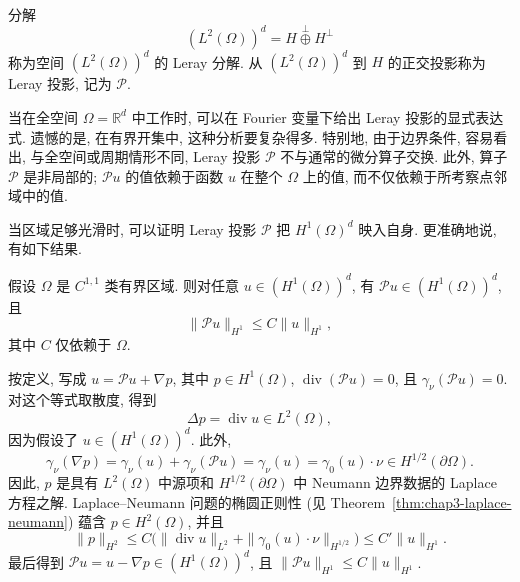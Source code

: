\begin{Definition}
\label{def:chap4-leray-decomposition}
分解
\[
 (L^2(\Omega))^d=H\mathbin{\mathop\oplus\limits^\perp}H^\perp
\]
称为空间 $(L^2(\Omega))^d$ 的 Leray 分解. 从 $(L^2(\Omega))^d$ 到 $H$ 的正交投影称为 Leray 投影, 记为 $\mathcal P$.
\end{Definition}

当在全空间 $\Omega=\mathbb R^d$ 中工作时, 可以在 Fourier 变量下给出 Leray 投影的显式表达式. 遗憾的是, 在有界开集中, 这种分析要复杂得多. 特别地, 由于边界条件, 容易看出, 与全空间或周期情形不同, Leray 投影 $\mathcal P$ 不与通常的微分算子交换. 此外, 算子 $\mathcal P$ 是非局部的; $\mathcal Pu$ 的值依赖于函数 $u$ 在整个 $\Omega$ 上的值, 而不仅依赖于所考察点邻域中的值.

当区域足够光滑时, 可以证明 Leray 投影 $\mathcal P$ 把 $H^1(\Omega)^d$ 映入自身. 更准确地说, 有如下结果.

\begin{Proposition}
\label{prop:chap4-leray-projection-h1}
假设 $\Omega$ 是 $C^{1,1}$ 类有界区域. 则对任意 $u\in(H^1(\Omega))^d$, 有 $\mathcal Pu\in(H^1(\Omega))^d$, 且
\[
 \|\mathcal Pu\|_{H^1}\leq C\|u\|_{H^1},
\]
其中 $C$ 仅依赖于 $\Omega$.
\end{Proposition}

\begin{Proof}
按定义, 写成 $u=\mathcal Pu+\nabla p$, 其中 $p\in H^1(\Omega)$, $\operatorname{div}(\mathcal Pu)=0$, 且 $\gamma_\nu(\mathcal Pu)=0$. 对这个等式取散度, 得到
\[
 \Delta p=\operatorname{div}u\in L^2(\Omega),
\]
因为假设了 $u\in(H^1(\Omega))^d$. 此外,
\[
 \gamma_\nu(\nabla p)
 =\gamma_\nu(u)+\gamma_\nu(\mathcal Pu)
 =\gamma_\nu(u)=\gamma_0(u)\cdot\nu
 \in H^{1/2}(\partial\Omega).
\]
因此, $p$ 是具有 $L^2(\Omega)$ 中源项和 $H^{1/2}(\partial\Omega)$ 中 Neumann 边界数据的 Laplace 方程之解. Laplace--Neumann 问题的椭圆正则性 (见 Theorem~\ref{thm:chap3-laplace-neumann}) 蕴含 $p\in H^2(\Omega)$, 并且
\[
 \|p\|_{H^2}
 \leq C\bigl(\|\operatorname{div}u\|_{L^2}
 +\|\gamma_0(u)\cdot\nu\|_{H^{1/2}}\bigr)
 \leq C'\|u\|_{H^1}.
\]
最后得到 $\mathcal Pu=u-\nabla p\in(H^1(\Omega))^d$, 且 $\|\mathcal Pu\|_{H^1}\leq C\|u\|_{H^1}$.
\end{Proof}
